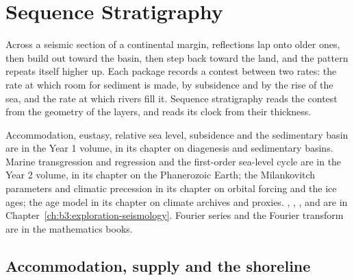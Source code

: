 \chapter{Sequence Stratigraphy}\label{ch:b3:sequence-stratigraphy}

Across a seismic section of a continental margin, reflections lap onto older
ones, then build out toward the basin, then step back toward the land, and
the pattern repeats itself higher up. Each package records a contest between
two rates: the rate at which room for sediment is made, by subsidence and by
the rise of the sea, and the rate at which rivers fill it. Sequence
stratigraphy reads the contest from the geometry of the layers, and
 reads its clock from their thickness.

\begin{recall}
Accommodation, eustasy, relative sea level, subsidence and the sedimentary
basin are in the Year 1 volume, in its chapter on diagenesis and sedimentary
basins. Marine transgression and regression and the first-order sea-level
cycle are in the Year 2 volume, in its chapter on the Phanerozoic Earth; the
Milankovitch parameters and climatic precession in its chapter on orbital
forcing and the ice ages; the age model in its chapter on climate archives
and proxies. , , ,  and  are in Chapter~\ref{ch:b3:exploration-seismology}. Fourier
series and the Fourier transform are in the mathematics books.
\end{recall}

\section{Accommodation, supply and the shoreline}\label{sec:b3:sequence-stratigraphy:shoreline}

